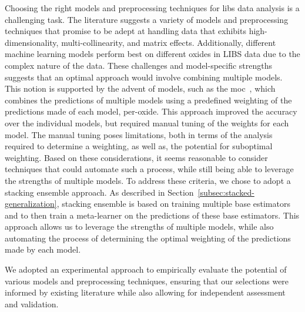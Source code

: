 Choosing the right models and preprocessing techniques for \gls{libs} data analysis is a challenging task. 
The literature suggests a variety of models and preprocessing techniques that promise to be adept at handling data that exhibits high-dimensionality, multi-collinearity, and matrix effects.
Additionally, different machine learning models perform best on different oxides in LIBS data due to the complex nature of the data. 
These challenges and model-specific strengths suggests that an optimal approach would involve combining multiple models. 
This notion is supported by the advent of models, such as the \gls{moc}~\cite{cleggRecalibrationMarsScience2017}, which combines the predictions of multiple models using a predefined weighting of the predictions made of each model, per-oxide.
This approach improved the accuracy over the individual models, but required manual tuning of the weights for each model.
The manual tuning poses limitations, both in terms of the analysis required to determine a weighting, as well as, the potential for suboptimal weighting.
Based on these considerations, it seems reasonable to consider techniques that could automate such a process, while still being able to leverage the strengths of multiple models.
To address these criteria, we chose to adopt a stacking ensemble approach. 
As described in Section~\ref{subsec:stacked-generalization}, stacking ensemble is based on training multiple base estimators and to then train a meta-learner on the predictions of these base estimators.
This approach allows us to leverage the strengths of multiple models, while also automating the process of determining the optimal weighting of the predictions made by each model.

We adopted an experimental approach to empirically evaluate the potential of various models and preprocessing techniques, ensuring that our selections were informed by existing literature while also allowing for independent assessment and validation.

